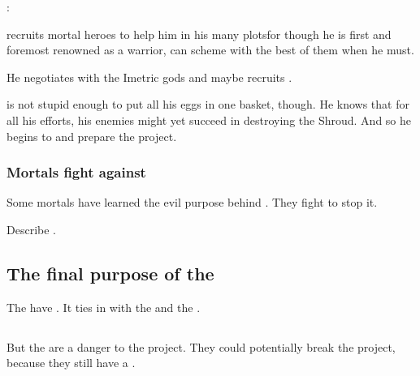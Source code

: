 \Ishnaruchaefir: 

\Ishnaruchaefir recruits mortal heroes to help him in his many plots\dash for though he is first and foremost renowned as a warrior, \Ishnaruchaefir can scheme with the best of them when he must. 

He negotiates with the Imetric gods and maybe recruits . 

\Ishnaruchaefir is not stupid enough to put all his eggs in one basket, though.
He knows that for all his efforts, his enemies might yet succeed in destroying the Shroud.
And so he begins to  and prepare the  project. 





\subsubsection{Mortals fight against \iquin}
Some mortals have learned the evil purpose behind \iquin. 
They fight to stop it. 

Describe . 









\subsection{The final purpose of the \Sephiroth}
The  have . 
It ties in with the  and the . 







\subsection{\Kezerad}
But the  are a danger to the \Sephirah{} project. They could potentially break the project, because they still have a .

